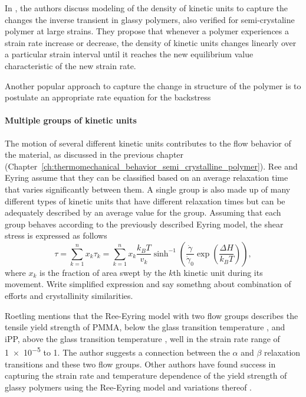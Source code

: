 
In \citep{gsellYieldTransientEffects1981}, the authors discuss modeling of the density of kinetic units to capture the changes the inverse transient in glassy polymers, also verified for semi-crystaline polymer at large strains.
They propose that whenever a polymer experiences a strain rate increase or decrease, the density of kinetic units changes linearly over a particular strain interval until it reaches the new equilibrium value characteristic of the new strain rate.

Another popular approach to capture the change in structure of the polymer is to postulate an appropriate rate equation for the backstress

\paragraph{Multiple groups of kinetic units}

The motion of several different kinetic units contributes to the flow behavior of the material, as discussed in the previous chapter (Chapter~\ref{ch:thermomechanical_behavior_semi_crystalline_polymer}).
Ree and Eyring \citep{reeTheoryNonNewtonian1955} assume that they can be classified based on an average relaxation time that varies significantly between them.
A single group is also made up of many different types of kinetic units that have different relaxation times but can be adequately described by an average value for the group.
Assuming that each group behaves according to the previously described Eyring model, the shear stress is expressed as follows
\begin{equation}
	\tau=\sum_{k=1}^n x_k \tau_k = \sum_{k=1}^n x_k\frac{k_B T}{v_k} \sinh^{-1}\left(\frac{\dot\gamma}{\dot\gamma_0}\exp\left(\frac{\Delta H}{k_B T}\right)\right),
\end{equation}
where $x_k$ is the fraction of area swept by the $k$th kinetic unit during its movement.
\colorbox{BrickRed}{Write simplified expression and say somethng about combination of efforts and crystallinity similarities.}

Roetling mentions that the Ree-Eyring model with two flow groups describes the tensile yield strength of PMMA, below the glass transition temperature \citep{roetlingYieldStressBehaviour1965}, and iPP, above the glass transition temperature \citep{roetlingYieldStressBehaviour1966}, well in the strain rate range of \num{1e-5} to \num{1}.
The author suggests a connection between the $\alpha$ and $\beta$ relaxation transitions and these two flow groups.
Other authors have found success in capturing the strain rate and temperature dependence of the yield strength of glassy polymers using the Ree-Eyring model and variations thereof \citep{bauwensTensileYieldstressBehavior1969, bauwensRelationCompressionYield1972, bauwens-crowetCompressionYieldBehaviour1973, haussyThermodynamicAnalysisPlastic1980}.


